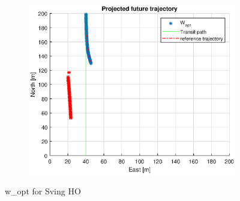 \begin{figure}
\begin{subfigure}[b]{0.499\textwidth}
    \end{subfigure}
    \hfill
    \begin{subfigure}[b]{0.5\textwidth}
        \centering
        \includegraphics[width=\textwidth]{Images/Figures/Sving_HO/simple0_f999_frame5}
    \end{subfigure}
    \caption{w\_opt for Sving HO}
\end{figure}


